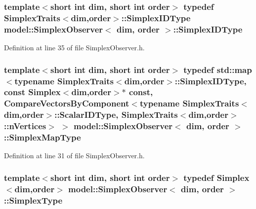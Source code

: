 \subsubsection[{Simplex\+I\+D\+Type}]{\setlength{\rightskip}{0pt plus 5cm}template$<$short int dim, short int order$>$ typedef {\bf Simplex\+Traits}$<${\bf dim},order$>$\+::{\bf Simplex\+I\+D\+Type} {\bf model\+::\+Simplex\+Observer}$<$ {\bf dim}, order $>$\+::{\bf Simplex\+I\+D\+Type}}\label{structmodel_1_1_simplex_observer_a270d41a2f2b7393f03651f9900b62c0b}


Definition at line 35 of file Simplex\+Observer.\+h.

\hypertarget{structmodel_1_1_simplex_observer_a220336a365d54235796aef669aebbf45}{}
\subsubsection[{Simplex\+Map\+Type}]{\setlength{\rightskip}{0pt plus 5cm}template$<$short int dim, short int order$>$ typedef std\+::map$<$typename {\bf Simplex\+Traits}$<${\bf dim},order$>$\+::{\bf Simplex\+I\+D\+Type}, const {\bf Simplex}$<${\bf dim},order$>$$\ast$ const, {\bf Compare\+Vectors\+By\+Component}$<$typename {\bf Simplex\+Traits}$<${\bf dim},order$>$\+::Scalar\+I\+D\+Type, {\bf Simplex\+Traits}$<${\bf dim},order$>$\+::n\+Vertices$>$ $>$ {\bf model\+::\+Simplex\+Observer}$<$ {\bf dim}, order $>$\+::{\bf Simplex\+Map\+Type}}\label{structmodel_1_1_simplex_observer_a220336a365d54235796aef669aebbf45}


Definition at line 31 of file Simplex\+Observer.\+h.

\hypertarget{structmodel_1_1_simplex_observer_a9cfe0e538763ae3802d2a9c011b3c061}{}
\subsubsection[{Simplex\+Type}]{\setlength{\rightskip}{0pt plus 5cm}template$<$short int dim, short int order$>$ typedef {\bf Simplex}$<${\bf dim},order$>$ {\bf model\+::\+Simplex\+Observer}$<$ {\bf dim}, order $>$\+::{\bf Simplex\+Type}}\label{structmodel_1_1_simplex_observer_a9cfe0e538763ae3802d2a9c011b3c061}


